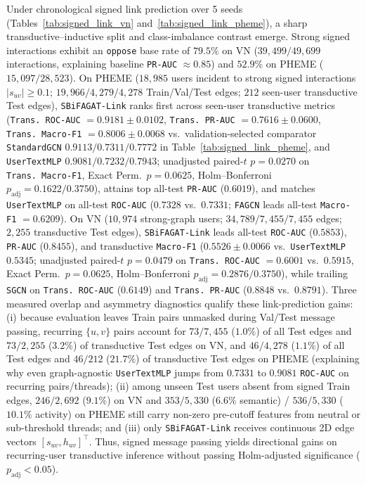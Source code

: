 \documentclass[conference]{IEEEtran}
\begin{document}
Under chronological signed link prediction over 5 seeds (Tables~\ref{tab:signed_link_vn} and~\ref{tab:signed_link_pheme}), a sharp transductive--inductive split and class-imbalance contrast emerge. Strong signed interactions exhibit an \texttt{oppose} base rate of $79.5\%$ on VN ($39{,}499/49{,}699$ interactions, explaining baseline \texttt{PR-AUC} $\approx 0.85$) and $52.9\%$ on PHEME ($15{,}097/28{,}523$). On PHEME ($18{,}985$ users incident to strong signed interactions $|s_{uv}| \ge 0.1$; $19{,}966/4{,}279/4{,}278$ Train/Val/Test edges; $212$ seen-user transductive Test edges), \texttt{SBiFAGAT-Link} ranks first across seen-user transductive metrics (\texttt{Trans.\ ROC-AUC} $= 0.9181 \pm 0.0102$, \texttt{Trans.\ PR-AUC} $= 0.7616 \pm 0.0600$, \texttt{Trans.\ Macro-F1} $= 0.8006 \pm 0.0068$ vs.\ validation-selected comparator \texttt{StandardGCN} $0.9113/0.7311/0.7772$ in Table~\ref{tab:signed_link_pheme}, and \texttt{UserTextMLP} $0.9081/0.7232/0.7943$; unadjusted paired-$t$ $p = 0.0270$ on \texttt{Trans.\ Macro-F1}, Exact Perm.\ $p = 0.0625$, Holm--Bonferroni $p_{\text{adj}} = 0.1622 / 0.3750$), attains top all-test \texttt{PR-AUC} ($0.6019$), and matches \texttt{UserTextMLP} on all-test \texttt{ROC-AUC} ($0.7328$ vs.\ $0.7331$; \texttt{FAGCN} leads all-test \texttt{Macro-F1} $= 0.6209$). On VN ($10{,}974$ strong-graph users; $34{,}789/7{,}455/7{,}455$ edges; $2{,}255$ transductive Test edges), \texttt{SBiFAGAT-Link} leads all-test \texttt{ROC-AUC} ($0.5853$), \texttt{PR-AUC} ($0.8455$), and transductive \texttt{Macro-F1} ($0.5526 \pm 0.0066$ vs.\ \texttt{UserTextMLP} $0.5345$; unadjusted paired-$t$ $p = 0.0479$ on \texttt{Trans.\ ROC-AUC} $= 0.6001$ vs.\ $0.5915$, Exact Perm.\ $p = 0.0625$, Holm--Bonferroni $p_{\text{adj}} = 0.2876 / 0.3750$), while trailing \texttt{SGCN} on \texttt{Trans.\ ROC-AUC} ($0.6149$) and \texttt{Trans.\ PR-AUC} ($0.8848$ vs.\ $0.8791$). Three measured overlap and asymmetry diagnostics qualify these link-prediction gains: (i) because evaluation leaves Train pairs unmasked during Val/Test message passing, recurring $\{u, v\}$ pairs account for $73/7{,}455$ ($1.0\%$) of all Test edges and $73/2{,}255$ ($3.2\%$) of transductive Test edges on VN, and $46/4{,}278$ ($1.1\%$) of all Test edges and $46/212$ ($21.7\%$) of transductive Test edges on PHEME (explaining why even graph-agnostic \texttt{UserTextMLP} jumps from $0.7331$ to $0.9081$ \texttt{ROC-AUC} on recurring pairs/threads); (ii) among unseen Test users absent from signed Train edges, $246/2{,}692$ ($9.1\%$) on VN and $353/5{,}330$ ($6.6\%$ semantic) / $536/5{,}330$ ($10.1\%$ activity) on PHEME still carry non-zero pre-cutoff features from neutral or sub-threshold threads; and (iii) only \texttt{SBiFAGAT-Link} receives continuous 2D edge vectors $[s_{uv}, h_{uv}]^\top$. Thus, signed message passing yields directional gains on recurring-user transductive inference without passing Holm-adjusted significance ($p_{\text{adj}} < 0.05$).
\end{document}

